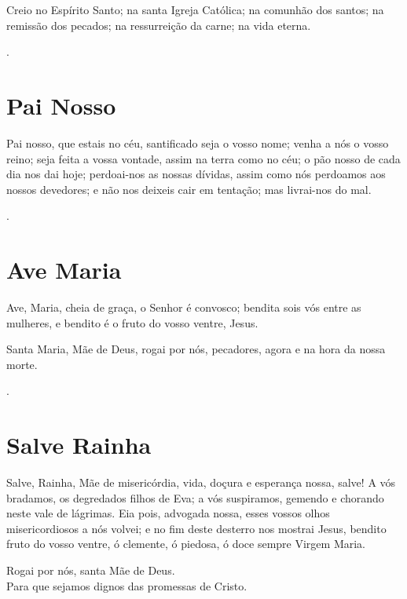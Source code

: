\documentclass{rosario}
\begin{document}
Creio no Espírito Santo;
na santa Igreja Católica;
na comunhão dos santos;
na remissão dos pecados;
na ressurreição da carne;
na vida eterna.

\amen.


\section{Pai Nosso}

Pai nosso, que estais no céu,
santificado seja o vosso nome;
venha a nós o vosso reino;
seja feita a vossa vontade,
assim na terra como no céu;
o pão nosso de cada dia nos dai hoje;
perdoai-nos as nossas dívidas,
assim como nós perdoamos aos nossos devedores;
e não nos deixeis cair em tentação;
mas livrai-nos do mal.

\amen.


\section{Ave Maria}

Ave, Maria, cheia de graça,
o Senhor é convosco;
bendita sois vós entre as mulheres,
e bendito é o fruto do vosso ventre,
Jesus.

Santa Maria, Mãe de Deus,
rogai por nós, pecadores,
agora e na hora da nossa morte.

\amen.


\section{Salve Rainha}

Salve, Rainha,
Mãe de misericórdia,
vida, doçura e esperança nossa, salve!
A vós bradamos, os degredados filhos de Eva;
a vós suspiramos, gemendo e chorando neste vale de lágrimas.
Eia pois, advogada nossa,
esses vossos olhos misericordiosos a nós volvei;
e no fim deste desterro nos mostrai Jesus,
bendito fruto do vosso ventre,
ó clemente, ó piedosa, ó doce sempre Virgem Maria.

Rogai por nós, santa Mãe de Deus. \\
Para que sejamos dignos das promessas de Cristo.
\end{document}
